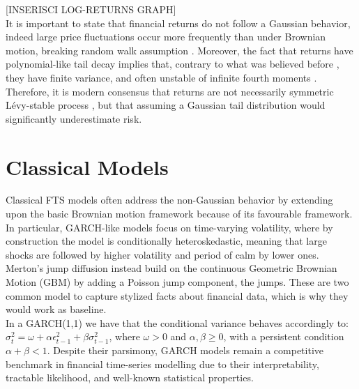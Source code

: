 [INSERISCI LOG-RETURNS GRAPH]\\

It is important to state that financial returns do not follow a Gaussian behavior, indeed large price fluctuations occur more frequently than under Brownian motion, breaking random walk assumption \cite{mandelbrot1963variation, fama1965random}. Moreover, the fact that returns have polynomial-like tail decay \cite{cont2001empirical} implies that, contrary to what was believed before \cite{mandelbrot1963variation}, they have finite variance, and often unstable of infinite fourth moments \cite{gopikrishnan1999scaling}. Therefore, it is modern consensus that returns are not necessarily symmetric Lévy-stable process \cite{mantegna1995scaling}, but that assuming a Gaussian tail distribution would significantly underestimate risk.\\

\section{Classical Models}
Classical FTS models often address the non-Gaussian behavior by extending upon the basic Brownian motion framework because of its favourable framework. In particular, GARCH-like models \cite{bollerslev1986generalized} focus on time-varying volatility, where by construction the model is conditionally heteroskedastic, meaning that large shocks are followed by higher volatility and period of calm by lower ones. Merton's jump diffusion \cite{merton1976option} instead build on the continuous Geometric Brownian Motion (GBM) by adding a Poisson jump component, the jumps. These are two common model to capture stylized facts about financial data, which is why they would work as baseline.\\

In a GARCH(1,1) we have that the conditional variance behaves accordingly to:\(\sigma_t^2=\omega+\alpha\epsilon_{t-1}^2+\beta \sigma_{t-1}^2\), where \(\omega>0\) and \(\alpha, \beta \ge 0\), with a persistent condition \(\alpha+\beta<1\). Despite their parsimony, GARCH models remain a competitive benchmark in financial time-series modelling due to their interpretability, tractable likelihood, and well-known statistical properties.\\

